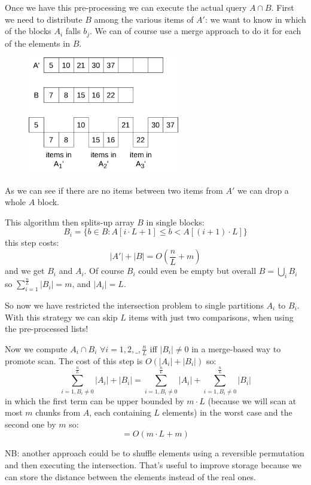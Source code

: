 Once we have this pre-processing we can execute the actual query $A \cap B$.
First we need to distribute $B$ among the various items of $A'$: we want to know in which of the blocks $A_i$ falls $b_j$. We can of course use a merge approach to do it for each of the elements in $B$.
\begin{figure}[H]
    \centering
    \includegraphics[width=250px]{images/6_Set_intersection/two_level.png}
\end{figure}
As we can see if there are no items between two items from $A'$ we can drop a whole $A$ block.

This algorithm then splits-up array $B$ in single blocks:
$$
    B_i = \{ b \in B : A[i \cdot L + 1] \leq b < A[(i+1) \cdot L] \}
$$
this step costs:
$$
    |A'| + |B| = O\left( \frac{n}{L} + m \right)
$$
and we get $B_i$ and $A_i$.
Of course $B_i$ could even be empty but overall $B = \bigcup_{i} B_i$ so $\sum_{i=1}^{\frac{n}{L}} |B_i| = m$, and $|A_i| = L$.

So now we have restricted the intersection problem to single partitions $A_i$ to $B_i$.
With this strategy we can skip $L$ items with just two comparisons, when using the pre-processed lists!

Now we compute $A_i \cap B_i$ $\forall i=1, 2, \_, \frac{n}{L}$ iff $|B_i| \neq 0$ in a merge-based way to promote scan.
The cost of this step is $O(|A_i| + |B_i|)$ so:
$$
    \sum_{i=1, B_i \neq 0}^{\frac{n}{L}} |A_i| + |B_i| = \sum_{i=1, B_i \neq 0}^\frac{n}{L} |A_i| + \sum_{i=1, B_i \neq 0}^\frac{n}{L} |B_i|
$$
in which the first term can be upper bounded by $m \cdot L$ (because we will scan at most $m$ chunks from $A$, each containing $L$ elements) in the worst case and the second one by $m$ so:
$$
    = O(m \cdot L + m)
$$

NB: another approach could be to shuffle elements using a reversible permutation and then executing the intersection.
That's useful to improve storage because we can store the distance between the elements instead of the real ones.

